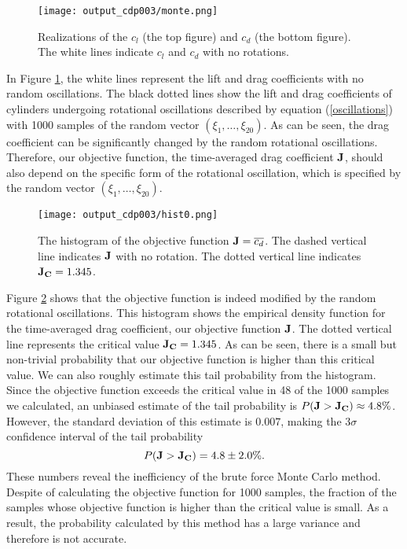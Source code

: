 \begin{figure}[ht!]\center
\texttt{[image: output\_cdp003/monte.png]}
\caption{Realizations of the $c_l$ (the top figure) and $c_d$
         (the bottom figure).  The white lines indicate $c_l$ and $c_d$ with
         no rotations.}
 \label{monte}
\end{figure}
In Figure \ref{monte}, the white lines represent the lift and drag coefficients
with no random oscillations.  The black dotted lines show the lift and drag
coefficients of cylinders undergoing rotational oscillations described by
equation (\ref{oscillations}) with 1000
samples of the random vector $(\xi_1,\ldots,\xi_{20})$.  As can be seen,
the drag coefficient can be significantly changed by the random
rotational oscillations.  Therefore, our objective function,
the time-averaged drag coefficient $\bf J$, should also depend on
the specific form of the rotational oscillation, which is specified by the
random vector $(\xi_1,\ldots,\xi_{20})$.

\begin{figure}[htb!]\center
\texttt{[image: output\_cdp003/hist0.png]}
\caption{The histogram of the objective function ${\bf J} = \overline{c_d}$.
         The dashed vertical line indicates ${\bf J}$ with no rotation.
         The dotted vertical line indicates ${\bf J_C} = 1.345$.}
 \label{hist0}
\end{figure}
Figure \ref{hist0} shows that the objective function is indeed modified by
the random rotational oscillations.  This histogram shows the empirical
density function for the time-averaged drag coefficient, our objective function
$\bf J$.  The dotted vertical line represents the critical value
${\bf J_C} = 1.345$.  As can be seen, there is a small but non-trivial
probability that our
objective function is higher than this critical value.  We can also roughly
estimate this tail probability from the histogram.
Since the objective function exceeds the critical value in 48 of
the 1000 samples we calculated, an unbiased estimate of the tail probability
is $P({\bf J} > {\bf J_C}) \approx 4.8\%$.
However, the standard deviation of this estimate is
$0.007$, making the $3\sigma$ confidence interval of the tail probability
\begin{equation} \label{number_monte}
P({\bf J} > {\bf J_C}) = 4.8 \pm 2.0 \% .
\end{equation}
These numbers reveal the inefficiency of the brute force Monte Carlo method.
Despite of calculating the objective function for 1000 samples, the fraction
of the samples whose objective function is higher than the critical value is
small.  As a result, the probability calculated by this method has a large
variance and therefore is not accurate.

